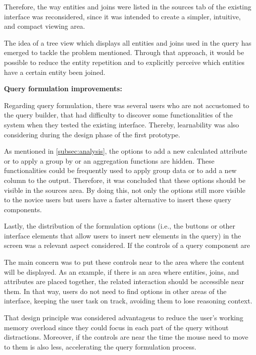Therefore, the way entities and joins were listed in the sources tab of the existing interface was reconsidered, since it was intended to create a simpler, intuitive, and compact viewing area.

The idea of a tree view which displays all entities and joins used in the query has emerged to tackle the problem mentioned. Through that approach, it would be possible to reduce the entity repetition and to explicitly perceive which entities have a certain entity been joined.

\medskip

\textbf{Query formulation improvements: }

\medskip

Regarding query formulation, there was several users who are not accustomed to the query builder, that had difficulty to discover some functionalities of the system when they tested the existing interface. Thereby, learnability was also considering during the design phase of the first prototype.

As mentioned in \ref{subsec:analysis}, the options to add a new calculated attribute or to apply a group by or an aggregation functions are hidden. These functionalities could be frequently used to apply group data or to add a new column to the output. Therefore, it was concluded that these options should be visible in the sources area. By doing this, not only the options still more visible to the novice users but users have a faster alternative to insert these query components.


Lastly, the distribution of the formulation options (i.e., the buttons or other interface elements that allow users to insert new elements in the query) in the screen was a relevant aspect considered. If the controls of a query component are

The main concern was to put these controls near to the area where the content will be displayed. As an example, if there is an area where entities, joins, and attributes are placed together, the related interaction should be accessible near them. In that way, users do not need to find options in other areas of the interface, keeping the user task on track, avoiding them to lose reasoning context.

That design principle was considered advantageus to reduce the user's working memory overload since they could focus in each part of the query without distractions. Moreover, if the controls are near the time the mouse need to move to them is also less, accelerating the query formulation process.

